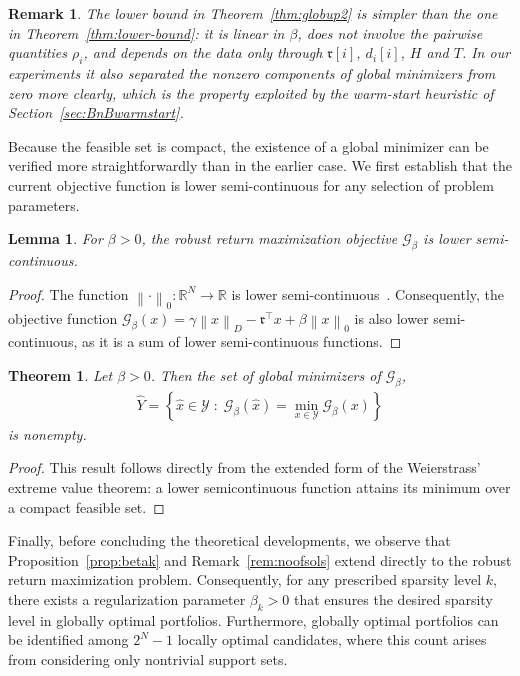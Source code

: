 \documentclass[11pt]{article}
\theoremstyle{plain}
\newtheorem{theorem}{Theorem}
\newtheorem{lemma}{Lemma}
\theoremstyle{definition}
\theoremstyle{plain}
\newtheorem{remark}{Remark}
\newcommand{\RR}{{\mathbb R}} %
\newcommand{\norm}[1]{\left\lVert#1\right\rVert}
\newcommand{\tpose}[1]{#1^{\top}}
\newcommand{\cG}{{\mathcal G}}
\newcommand{\ccr}{{\mathfrak r}}
\newcommand{\cY}{{\mathcal Y}}
\begin{document}
   \begin{remark}
       The lower bound in Theorem~\ref{thm:globup2} is simpler than the one in Theorem~\ref{thm:lower-bound}: it is linear in $\beta$, does not involve the pairwise quantities $\rho_i$, and depends on the data only through $\ccr[i]$, $d_i[i]$, $H$ and $T$. In our experiments it also separated the nonzero components of global minimizers from zero more clearly, which is the property exploited by the warm-start heuristic of Section~\ref{sec:BnBwarmstart}.
   \end{remark}
Because the feasible set is compact, the existence of a global minimizer can be verified more straightforwardly than in the earlier case. We first establish that the current objective function is lower semi-continuous for any selection of problem parameters.
   \begin{lemma}
       For $\beta>0$, the robust return maximization objective $\cG_\beta$ is lower semi-continuous.
   \end{lemma}
   \begin{proof}
      The function $\norm{\cdot}_0 : \RR^N \rightarrow \RR$ is lower semi-continuous~\cite[Proof of Proposition~4.3]{Nikolova2013}. Consequently, the objective function $\cG_\beta(x) = \gamma \norm{x}_D - \tpose{\ccr} x + \beta \norm{x}_0$ is also lower semi-continuous, as it is a sum of lower semi-continuous functions.
   \end{proof}
   \begin{theorem}
	Let $\beta>0$. Then the set of global minimizers of $\cG_\beta$,
	\begin{align*}
		\hat{Y}=\left\{\hat{x}\in\cY\;:\;\cG_\beta(\hat{x})=\min_{x\in\cY}\cG_{\beta}(x)\right\}
	\end{align*}
	is nonempty.
\end{theorem}
\begin{proof}
    This result follows directly from the extended form of the Weierstrass' extreme value theorem: a lower semicontinuous function attains its minimum over a compact feasible set.
\end{proof}
Finally, before concluding the theoretical developments, we observe that Proposition~\ref{prop:betak} and Remark~\ref{rem:noofsols} extend directly to the robust return maximization problem. Consequently, for any prescribed sparsity level $k$, there exists a regularization parameter $\beta_k > 0$ that ensures the desired sparsity level in globally optimal portfolios. Furthermore, globally optimal portfolios can be identified among $2^N - 1$ locally optimal candidates, where this count arises from considering only nontrivial support sets.
\end{document}
